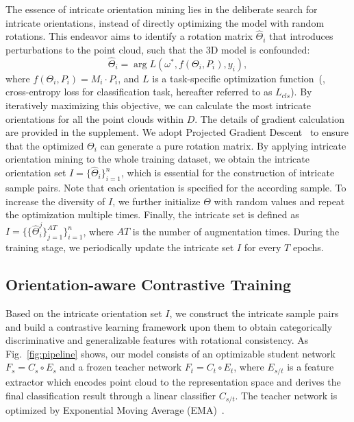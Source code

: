 The essence of intricate orientation mining lies in the deliberate search for intricate orientations, instead of directly optimizing the model with random rotations. This endeavor aims to identify a rotation matrix $\hat{\Theta}_i$ that introduces perturbations to the point cloud, such that the 3D model is confounded:
\begin{equation}
    \hat{\Theta}_i = \mathop{\arg\max_{\Theta_i}}L(\omega^*, f(\Theta_i, P_i), y_i), \label{formula:iom}
\end{equation}
where $f(\Theta_i, P_i)=M_i\cdot P_i$, and $L$ is a task-specific optimization function~(\eg, cross-entropy loss for classification task, hereafter referred to as $L_{cls}$). By iteratively maximizing this objective, we can calculate the most intricate orientations for all the point clouds within $D$. The details of gradient calculation are provided in the supplement. We adopt Projected Gradient Descent~\cite{madrytowards} to ensure that the optimized $\Theta_i$ can generate a pure rotation matrix. By applying intricate orientation mining to the whole training dataset, we obtain the intricate orientation set $I=\{\hat{\Theta}_{i}\}^{n}_{i=1}$, which is essential for the construction of intricate sample pairs. Note that each orientation is specified for the according sample. To increase the diversity of $I$, we further initialize $\Theta$ with random values and repeat the optimization multiple times. Finally, the intricate set is defined as $I=\{\{\hat{\Theta}^j_{i}\}^{AT}_{j=1}\}^{n}_{i=1}$, where $AT$ is the number of augmentation times. During the training stage, we periodically update the intricate set $I$ for every $T$ epochs. 




\subsection{Orientation-aware Contrastive Training}

Based on the intricate orientation set $I$, we construct the intricate sample pairs and build a contrastive learning framework upon them to obtain categorically discriminative and generalizable features with rotational consistency. As Fig.~\ref{fig:pipeline} shows, our model consists of an optimizable student network $F_s\!=\!C_s\circ E_s$ and a frozen teacher network $F_t\!=\!C_t\circ E_t$, where $E_{s/t}$ is a feature extractor which encodes point cloud to the representation space and derives the final classification result through a linear classifier $C_{s/t}$. The teacher network is optimized by Exponential Moving Average (EMA)~\cite{tarvainen2017mean}.

